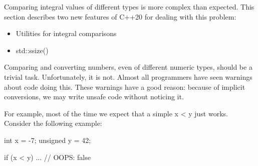
Comparing integral values of different types is more complex than expected. This section describes two new features of C++20 for dealing with this problem:

\begin{itemize}
\item 
Utilities for integral comparisons

\item 
std::ssize()
\end{itemize}


Comparing and converting numbers, even of different numeric types, should be a trivial task. Unfortunately, it is not. Almost all programmers have seen warnings about code doing this. These warnings have a good reason: because of implicit conversions, we may write unsafe code without noticing it.

For example, most of the time we expect that a simple x < y just works. Consider the following example:

\begin{cpp}
int x = -7;
unsigned y = 42;

if (x < y) ... // OOPS: false
\end{cpp}














